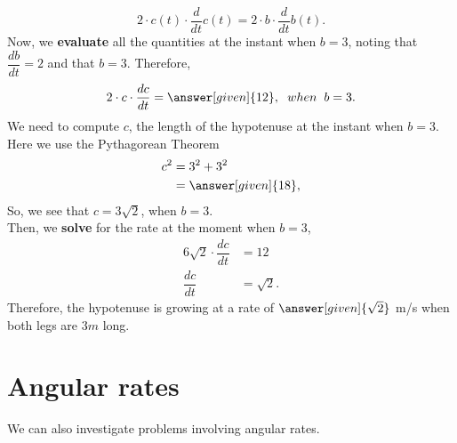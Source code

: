 \documentclass{ximera}
\begin{document}
\begin{example}
\begin{explanation}
       \[
    2\cdot c(t)\cdot\dfrac{d}{dt}c(t) = 2\cdot b\cdot\dfrac{d}{dt}b(t).
    \]
    Now, we \textbf{evaluate} all the quantities at the instant when $b=3$, noting that
    $\dfrac{db}{dt} = 2$ and that $b = 3$. Therefore,
    \[
    2\cdot c\cdot\dfrac{dc}{dt}= \answer[given]{12},\hspace{0.08in} when\hspace{0.08in}b=3.
    \]
    We need to compute $c$, the length of the hypotenuse at the instant when $b=3$. Here we use
    the Pythagorean Theorem
    \begin{align*}
  c^2 &= 3^2 + 3^2\\
    &=\answer[given]{18},
    \end{align*}
    So, we see that $c = 3\sqrt{2}$, when $b=3$. \\
    Then, we \textbf{solve} for the rate at the moment when $b=3$,\\
    \begin{align*}
      6\sqrt{2}\cdot \dfrac{dc}{dt} &= 12 \\     
    \dfrac{dc}{dt} &= \sqrt{2}.
    \end{align*}
    Therefore, the hypotenuse  is growing at a rate of $\answer[given]{\sqrt{2}}$ m/s when both legs are $3m$ long.
  \end{explanation}
\end{example}


\section{Angular rates}


We can also investigate problems involving angular rates.
\end{document}
